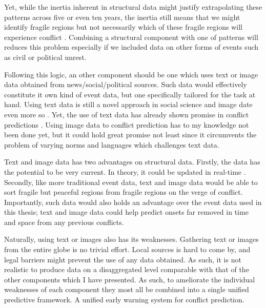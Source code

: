 \documentclass[a4paper]{article}
\begin{document}
Yet, while the inertia inherent in structural data might justify extrapolating these patterns across five or even ten years, the inertia still means that we might identify fragile regions but not necessarily which of these fragile regions will experience conflict \citep[10]{chadefaux2017conflict}. Combining a structural component with one of patterns will reduces this problem especially if we included data on other forms of events such as civil or political unrest.\par 

Following this logic, an other component should be one which uses text or image data obtained from news/social/political sources. Such data would effectively constitute it own kind of event data, but one specifically tailored for the task at hand. Using text data is still a novel approach in social science \citep{grimmer2013text} and image date even more so \citep{williams2019images}. Yet, the use of text data has already shown promise in conflict predictions \citep{chadefaux_2014, mueller_2016}. Using image data to conflict prediction has to my knowledge not been done yet, but it could hold great promise not least since it circumvents the problem of varying norms and languages which challenges text data. \par

Text and image data has two advantages on structural data. Firstly, the data has the potential to be very current. In theory, it could be updated in real-time \citep[474]{cederman2017predicting}. Secondly, like more traditional event data, text and image data would be able to sort fragile but peaceful regions from fragile regions on the verge of conflict. Importantly, such data would also holds an advantage over the event data used in this thesis; text and image data could help predict onsets far removed in time and space from any previous conflicts.\par

Naturally, using text or images also has its weaknesses. Gathering text or images from the entire globe is no trivial effort. Local sources is hard to come by, and legal barriers might prevent the use of any data obtained. As such, it is not realistic to produce data on a disaggregated level comparable with that of the other components which I have presented. As such, to ameliorate the individual weaknesses of each component they most all be combined into a single unified predictive framework. A unified early warning system for conflict prediction.\par
\end{document}
